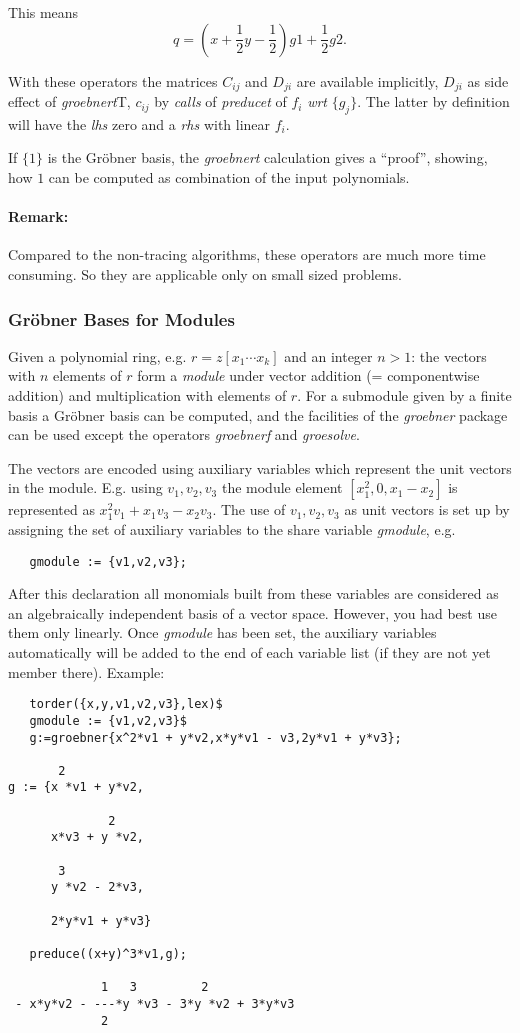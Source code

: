 This means
\[ q = ( x + \frac{1}{2} y - \frac{1}{2}) g1 + \frac{1}{2} g2.
\]

With these operators the matrices $C_{ij}$ and $D_{ji}$ are available
implicitly, $D_{ji}$ as side effect of \emph{groebnert}T, $c_{ij}$ by {\it calls}
of \emph{preducet} of $f_i$ {\it wrt} $\{g_j\}$. The latter by definition will
have the {\it lhs} zero and a {\it rhs} with linear $f_i$.

If $\{1\}$ is the Gr\"obner basis, the \emph{groebnert} calculation gives
a ``proof'', showing,  how  $1$ can be computed as combination of the
input polynomials.

\paragraph{Remark:} Compared to the non-tracing algorithms, these
operators are much more time consuming. So they are applicable
only on small sized problems.

\subsubsection{Gr\"obner Bases for Modules}

Given a polynomial ring, e.g. $r=z[x_1 \cdots x_k]$ and
an integer $n>1$: the vectors with $n$ elements of $r$
form a \emph{module} under vector addition (= componentwise addition)
and multiplication with elements of $r$. For a submodule
given by a finite basis a Gr\"obner basis
can be computed, and the facilities of the \emph{groebner} package
can be used except the operators \emph{groebnerf} and \emph{groesolve}.

The vectors are encoded using auxiliary variables which represent
the unit vectors in the module. E.g. using ${v_1,v_2,v_3}$ the
module element $[x_1^2,0,x_1-x_2]$ is represented as
$x_1^2 v_1 + x_1 v_3 - x_2 v_3$. The use of ${v_1,v_2,v_3}$
as unit vectors is set up by assigning the set of auxiliary variables
to the share variable \emph{gmodule}, e.g.
\begin{verbatim}
   gmodule := {v1,v2,v3};
\end{verbatim}
After this declaration all monomials built from these variables
are considered as an algebraically independent basis of a vector
space. However, you had best use them only linearly. Once \emph{gmodule}
has been set, the auxiliary variables automatically will be
added to the end of each variable list (if they are not yet
member there).
Example:
\begin{verbatim}
   torder({x,y,v1,v2,v3},lex)$
   gmodule := {v1,v2,v3}$
   g:=groebner{x^2*v1 + y*v2,x*y*v1 - v3,2y*v1 + y*v3};

       2
g := {x *v1 + y*v2,

              2
      x*v3 + y *v2,

       3
      y *v2 - 2*v3,

      2*y*v1 + y*v3}

   preduce((x+y)^3*v1,g);

             1   3         2
 - x*y*v2 - ---*y *v3 - 3*y *v2 + 3*y*v3
             2
\end{verbatim}

